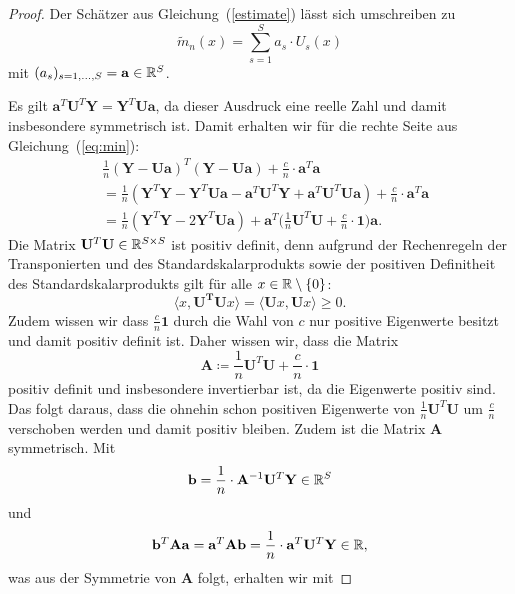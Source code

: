 \begin{proof}
Der Schätzer aus Gleichung~(\ref{estimate}) lässt sich umschreiben zu 
\begin{equation}
\label{umschreiben}
\tilde{m}_n(x) = \sum_{s = 1}^S a_s \cdot U_s(x)
\end{equation}
mit $(a_s)_{s = 1,\dots,S} = \mathbf{a}\in \mathbb{R}^S$. 

Es gilt $\mathbf{a}^T\mathbf{U}^T\mathbf{Y} = \mathbf{Y}^T\mathbf{U}\mathbf{a}$, da dieser Ausdruck eine reelle Zahl und damit insbesondere symmetrisch ist. Damit erhalten wir für die rechte Seite aus Gleichung~(\ref{eq:min}):
\begin{equation}
\label{eq:matrix}
\begin{split}
& \frac{1}{n}(\mathbf{Y} - \mathbf{U}\mathbf{a})^T(\mathbf{Y} - \mathbf{U}\mathbf{a}) + \frac{c}{n} \cdot \mathbf{a}^T\mathbf{a} \\
& = \frac{1}{n}(\mathbf{Y}^T\mathbf{Y} - \mathbf{Y}^T\mathbf{U}\mathbf{a} - \mathbf{a}^T\mathbf{U}^T\mathbf{Y} + \mathbf{a}^T\mathbf{U}^T\mathbf{U}\mathbf{a}) + \frac{c}{n} \cdot \mathbf{a}^T\mathbf{a} \\
& = \frac{1}{n}(\mathbf{Y}^T\mathbf{Y} - 2\mathbf{Y}^T\mathbf{U}\mathbf{a}) + \mathbf{a}^T\bigg(\frac{1}{n} \mathbf{U}^T\mathbf{U} + \frac{c}{n} \cdot \mathbf{1}\bigg) \mathbf{a}.
\end{split}
\end{equation} 
Die Matrix $\mathbf{U}^T\mathbf{U} \in \mathbb{R}^{S \times S}$ ist positiv definit, denn aufgrund der Rechenregeln der Transponierten und des Standardskalarprodukts sowie der positiven Definitheit des Standardskalarprodukts gilt für alle $x \in \mathbb{R}\setminus\{0\}$:
$$\langle x, \mathbf{U^T}\mathbf{U} x\rangle = \langle \mathbf{U} x, \mathbf{U} x\rangle \geq 0.$$
Zudem wissen wir dass $\frac{c}{n}\mathbf{1}$ durch die Wahl von $c$ nur positive Eigenwerte besitzt und damit positiv definit ist.  
Daher wissen wir, dass die Matrix
$$\mathbf{A} \coloneqq \frac{1}{n}\mathbf{U}^T\mathbf{U} + \frac{c}{n} \cdot \mathbf{1}$$ positiv definit und insbesondere invertierbar ist, da die Eigenwerte positiv sind. Das folgt daraus, dass die ohnehin schon positiven Eigenwerte von $\frac{1}{n}\mathbf{U}^T\mathbf{U}$ um $\frac{c}{n}$ verschoben werden und damit positiv bleiben. Zudem ist die Matrix $\mathbf{A}$ symmetrisch. 
Mit $$\mathbf{b} = \frac{1}{n} \cdot \mathbf{A}^{-1}\mathbf{U}^T\mathbf{Y} \in \mathbb{R}^S$$ und $$\mathbf{b}^T\mathbf{A}\mathbf{a} = \mathbf{a}^T\mathbf{A}\mathbf{b} = \frac{1}{n} \cdot \mathbf{a}^T\mathbf{U}^T\mathbf{Y} \in \mathbb{R},$$ was aus der Symmetrie von $\mathbf{A}$ folgt, erhalten wir mit 

\end{proof}
